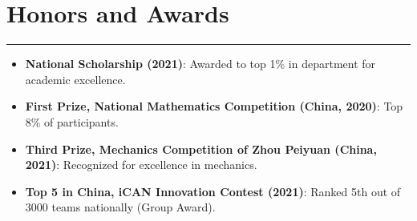\documentclass[10pt]{article} %
\begin{document}





\section*{Honors and Awards}
\hrule


\begin{itemize}[leftmargin=*,itemsep=1pt]
    \item \textbf{National Scholarship (2021)}: Awarded to top 1\% in department for academic excellence.
    \item \textbf{First Prize, National Mathematics Competition (China, 2020)}: Top 8\% of participants.
    \item \textbf{Third Prize, Mechanics Competition of Zhou Peiyuan (China, 2021)}: Recognized for excellence in mechanics.
    \item \textbf{Top 5 in China, iCAN Innovation Contest (2021)}: Ranked 5th out of 3000 teams nationally (Group Award).
\end{itemize}
\end{document}
